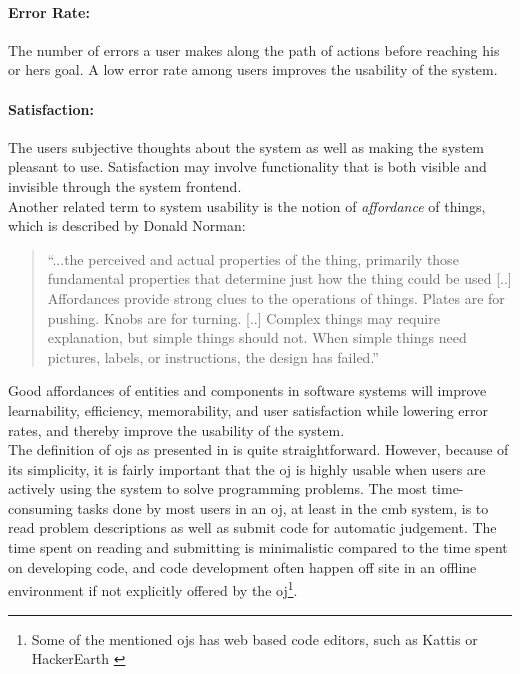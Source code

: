 \paragraph*{Error Rate:} The number of errors a user makes along the path of actions before reaching his or hers goal. A low error rate among users improves the usability of the system.

\paragraph*{Satisfaction:} The users subjective thoughts about the system as well as making the system pleasant to use. Satisfaction may involve functionality that is both visible and invisible through the system frontend.\\

Another related term to system usability is the notion of \textit{affordance} of things, which is described by Donald Norman:
\blockquote{``...the perceived and actual properties of the thing, primarily those fundamental properties that determine just how the thing could be used [..] Affordances provide strong clues to the operations of things. Plates are for pushing. Knobs are for turning. [..] Complex things may require explanation, but simple things should not. When simple things need pictures, labels, or instructions, the design has failed.''  \cite{norman1988design}}

Good affordances of entities and components in software systems will improve learnability, efficiency, memorability, and user satisfaction while lowering error rates, and thereby improve the usability of the system. \\

The definition of \glspl{oj} as presented in  is quite straightforward. However, because of its simplicity, it is fairly important that the \gls{oj} is highly usable when users are actively using the system to solve programming problems. The most time-consuming tasks done by most users in an \gls{oj}, at least in the \gls{cmb} system, is to read problem descriptions as well as submit code for automatic judgement. The time spent on reading and submitting is minimalistic compared to the time spent on developing code, and code development often happen off site in an offline environment if not explicitly offered by the \gls{oj}\footnote{Some of the mentioned \glspl{oj} has web based code editors, such as Kattis \cite{KATTIS} or HackerEarth \cite{HACKEREARTH}}. \\

